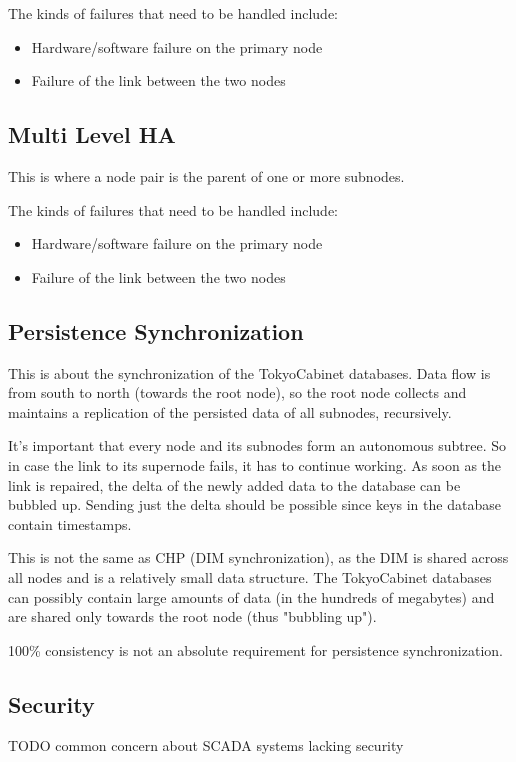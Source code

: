 The kinds of failures that need to be handled include:
\begin{itemize}
	\item Hardware/software failure on the primary node
	\item Failure of the link between the two nodes
\end{itemize}



\subsection{Multi Level HA}
This is where a node pair is the parent of one or more subnodes.

The kinds of failures that need to be handled include:
\begin{itemize}
	\item Hardware/software failure on the primary node
	\item Failure of the link between the two nodes
\end{itemize}

\subsection{Persistence Synchronization}
This is about the synchronization of the TokyoCabinet databases. Data flow is
from south to north (towards the root node), so the root node collects and
maintains a replication of the persisted data of all subnodes, recursively.

It's important that every node and its subnodes form an autonomous subtree. So
in case the link to its supernode fails, it has to continue working. As soon as
the link is repaired, the delta of the newly added data to the database can be
bubbled up. Sending just the delta should be possible since keys in the
database contain timestamps.

This is not the same as CHP (DIM synchronization), as the DIM is shared across
all nodes and is a relatively small data structure. The TokyoCabinet databases
can possibly contain large amounts of data (in the hundreds of megabytes) and
are shared only towards the root node (thus "bubbling up").

100\% consistency is not an absolute requirement for persistence synchronization.

\subsection{Security}
TODO common concern about SCADA systems lacking security\\

